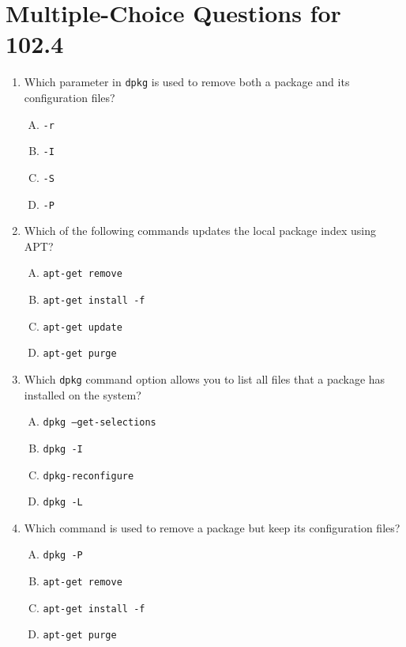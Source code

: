 \documentclass[a4paper]{report}
\begin{document}
\newpage
\section*{Multiple-Choice Questions for 102.4}

\begin{enumerate}[1.]

    \item Which parameter in \texttt{dpkg} is used to remove both a package and its configuration files?  
    \begin{enumerate}[A)]
        \item \texttt{-r}  
        \item \texttt{-I}  
        \item \texttt{-S}  
        \item \texttt{-P}  
    \end{enumerate}

    \item Which of the following commands updates the local package index using APT?  
    \begin{enumerate}[A)]
        \item \texttt{apt-get remove}  
        \item \texttt{apt-get install -f}  
        \item \texttt{apt-get update}  
        \item \texttt{apt-get purge}  
    \end{enumerate}

    \item Which \texttt{dpkg} command option allows you to list all files that a package has installed on the system?  
    \begin{enumerate}[A)]
        \item \texttt{dpkg --get-selections}  
        \item \texttt{dpkg -I}  
        \item \texttt{dpkg-reconfigure}  
        \item \texttt{dpkg -L}  
    \end{enumerate}

    \item Which command is used to remove a package but keep its configuration files?  
    \begin{enumerate}[A)]
        \item \texttt{dpkg -P}  
        \item \texttt{apt-get remove}  
        \item \texttt{apt-get install -f}  
        \item \texttt{apt-get purge}  
    \end{enumerate}


\end{enumerate}
\end{document}
